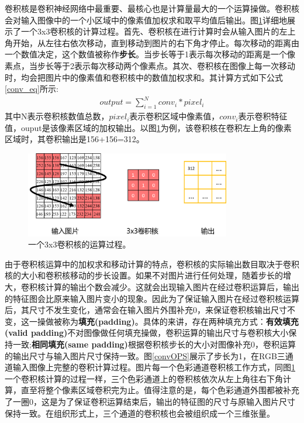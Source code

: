 卷积核是卷积神经网络中最重要、最核心也是计算量最大的一个运算操做。卷积核会对输入图像中的一个小区域中的像素值加权求和取平均值后输出。图\ref{convOne}详细地展示了一个3x3卷积核的计算过程。首先、卷积核在进行计算时会从输入图片的左上角开始，从左往右依次移动，直到移动到图片的右下角才停止。每次移动的距离由一个数值决定，这个数值被称作\textbf{步长}。当步长等于1表示每次移动的距离是一个像素点，当步长等于2表示每次移动两个像素点。其次、卷积核在图像上每一次移动时，均会把图片中的像素值和卷积核中的数值加权求和。其计算方式如下公式\ref{conv_eq}所示:
\begin{equation}
\begin{aligned}
\label{conv_eq}
output = \sum_{i=1}^N conv_i*pixel_i
\end{aligned}
\end{equation}
其中N表示卷积核数值总数，$pixel_i$表示卷积区域中像素值，$conv_i$表示卷积特征值，ouput是该像素区域的加权输出。以图\ref{convOne}为例，该卷积核在卷积左上角的像素区域时，其卷积输出是156+156=312。
\begin{figure}[ht]
	\centering
	\includegraphics[width=0.8\textwidth]{figures/convOne.png}
	\caption{一个3x3卷积核的运算过程。}
	\label{convOne}
\end{figure}

由于卷积核运算中的加权求和移动计算的特点，卷积核的实际输出数目取决于卷积核的大小和卷积核移动的步长设置。如果不对图片进行任何处理，随着步长的增大，卷积核计算的输出个数会减少。这就会出现输入图片在经过卷积运算后，输出的特征图会比原来输入图片变小的现象。因此为了保证输入图片在经过卷积核运算后，其尺寸不发生变化，通常会在输入图片外围补充0，来保证卷积核输出尺寸不变，这一操做被称为\textbf{填充(padding)}。具体的来讲，存在两种填充方式：\textbf{有效填充(valid padding)}不对图像做任何填充操做，卷积运算的输出尺寸与卷积核大小保持一致;\textbf{相同填充(same padding)}根据卷积核步长的大小对图像补充0，卷积运算的输出尺寸与输入图片尺寸保持一致。图\ref{convOPS}展示了步长为1，在RGB三通道输入图像上完整的卷积计算过程。图片每一个色彩通道卷积核工作方式，同图\ref{convOne}一个卷积核计算的过程一样，三个色彩通道上的卷积核依次从左上角往右下角计算，直至将整个像素区域卷积完为止。值得注意的是，每个色彩通道外围都被补充了一圈0，这是为了保证卷积运算结束后，输出的特征图的尺寸与原输入图片尺寸保持一致。在组织形式上，三个通道的卷积核也会被组织成一个三维张量。


